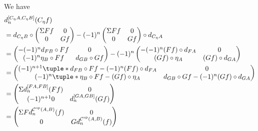 \begin{remark}
\begin{itemize}
{            We have
            \begin{align*}
                &d_n^{[C_{\eta} A, C_{\eta} B]} (C_{\eta} f) \\
                &= d_{C_{\eta} B} \circ
                \begin{pmatrix}
                    \Sigma F f & 0 \\
                    0 & G f
                \end{pmatrix}
                - (-1)^n
                \begin{pmatrix}
                    \Sigma F f & 0 \\
                    0 & G f
                \end{pmatrix}
                \circ d_{C_{\eta} A} \\
                &=
                \begin{pmatrix}
                    -(-1)^n d_{F B} \circ F f & 0 \\
                    (-1)^n \eta_B \circ F f & d_{G B} \circ G f
                \end{pmatrix} - (-1)^n
                \begin{pmatrix}
                    -(-1)^n (F f) \circ d_{F A} & 0 \\
                    (G f) \circ \eta_A & (G f) \circ d_{G A}
                \end{pmatrix} \\
                &=
                \begin{pmatrix}
                    (-1)^{n + 1}\tuple*{d_{F B} \circ F f - (-1)^n (F f) \circ d_{F A}} & 0 \\
                    (-1)^n\tuple*{\eta_B \circ F f - (G f) \circ \eta_A} & d_{G B} \circ G f - (-1)^n (G f) \circ d_{G A}
                \end{pmatrix} \\
                &=
                \begin{pmatrix}
                    \Sigma d_n^{[F A, F B]}(F f) & 0 \\
                    (-1)^{n + 1} 0 & d_n^{[G A, G B]}(G f)
                \end{pmatrix} \\
                &=
                \begin{pmatrix}
                    \Sigma F d_n^{\Cc^{\op}(A, B)}(f) & 0 \\
                    0 & G d_n^{\Cc^{\op}(A, B)}(f)
                \end{pmatrix} \\

\end{align*}}
\end{itemize}
\end{remark}

